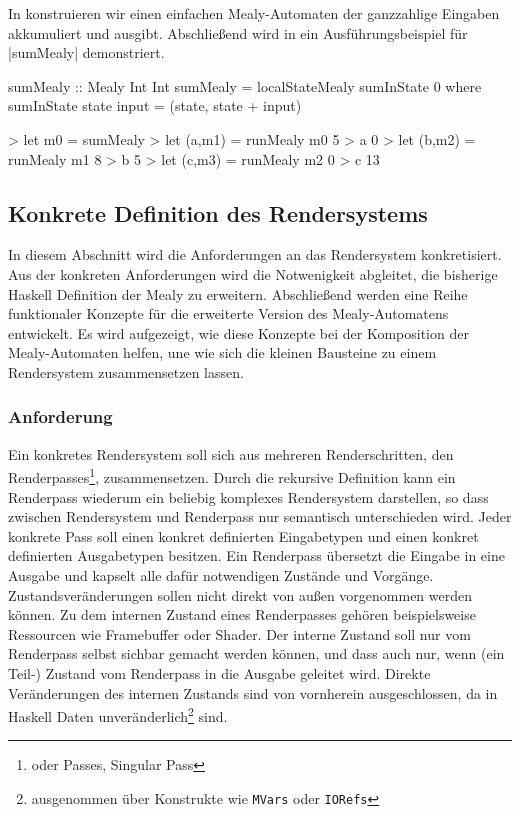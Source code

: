 In  konstruieren wir einen einfachen Mealy-Automaten der ganzzahlige Eingaben akkumuliert und ausgibt. Abschließend wird in  ein Ausführungsbeispiel für |sumMealy| demonstriert.

\begin{haskell}[label={lst:state-mealy-beispiel},caption={[Beispiel Mealy-Automat mit lokalem Zustand]Beispiel Mealy-Automat mit lokalem Zustand}]
sumMealy :: Mealy Int Int
sumMealy = localStateMealy sumInState 0 where
	sumInState state input = (state, state + input)
\end{haskell}

\begin{haskell}[label={lst:state-mealy-ausfuehrung},nolol,caption={Ausführung Mealy-Automat mit lokalem Zustand}]
> let m0 = sumMealy
> let (a,m1) = runMealy m0 5
> a
0
> let (b,m2) = runMealy m1 8
> b
5
> let (c,m3) = runMealy m2 0
> c
13
\end{haskell}

\subsection{Konkrete Definition des Rendersystems}
\label{sec:konkret-rendersystem}

In diesem Abschnitt wird die Anforderungen an das Rendersystem konkretisiert. Aus der konkreten Anforderungen wird die Notwenigkeit abgleitet, die bisherige Haskell Definition der Mealy zu erweitern. Abschließend werden eine Reihe funktionaler Konzepte für die erweiterte Version des Mealy-Automatens entwickelt. Es wird aufgezeigt, wie diese Konzepte bei der Komposition der Mealy-Automaten helfen, une wie sich die kleinen Bausteine zu einem Rendersystem zusammensetzen lassen.

\subsubsection{Anforderung}
Ein konkretes Rendersystem soll sich aus mehreren Renderschritten, den Renderpasses\footnote{oder Passes, Singular Pass}, zusammensetzen. Durch die rekursive Definition kann ein Renderpass wiederum ein beliebig komplexes Rendersystem darstellen, so dass zwischen Rendersystem und Renderpass nur semantisch unterschieden wird. Jeder konkrete Pass soll einen konkret definierten Eingabetypen und einen konkret definierten Ausgabetypen besitzen. Ein Renderpass übersetzt die Eingabe in eine Ausgabe und kapselt alle dafür notwendigen Zustände und Vorgänge. Zustandsveränderungen sollen nicht direkt von außen vorgenommen werden können. Zu dem internen Zustand eines Renderpasses gehören beispielsweise Ressourcen wie Framebuffer oder Shader. Der interne Zustand soll nur vom Renderpass selbst sichbar gemacht werden können, und dass auch nur, wenn (ein Teil-) Zustand vom Renderpass in die Ausgabe geleitet wird. Direkte Veränderungen des internen Zustands sind von vornherein ausgeschlossen, da in Haskell Daten unveränderlich\footnote{ausgenommen über Konstrukte wie \texttt{MVars} oder \texttt{IORefs}} sind.

